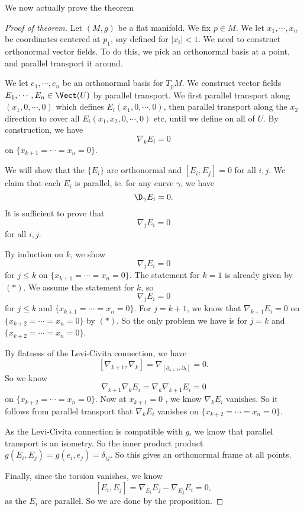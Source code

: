 \documentclass[a4paper]{article}
\begin{document}
We now actually prove the theorem
\begin{proof}[Proof of theorem]
  Let $(M, g)$ be a flat manifold. We fix $p \in M$. We let $x_1, \cdots, x_n$ be coordinates centered at $p_1$, say defined for $|x_i| < 1$. We need to construct orthonormal vector fields. To do this, we pick an orthonormal basis at a point, and parallel transport it around.

  We let $e_1, \cdots, e_n$ be an orthonormal basis for $T_p M$. We construct vector fields $E_1, \cdots, E_n \in \Vect(U)$ by parallel transport. We first parallel transport along $(x_1, 0, \cdots, 0)$ which defines $E_i(x_1, 0, \cdots, 0)$, then parallel transport along the $x_2$ direction to cover all $E_i(x_1, x_2, 0, \cdots, 0)$ etc, until we define on all of $U$. By construction, we have
  \[
    \nabla_k E_i = 0\tag{$*$}
  \]
  on $\{x_{k + 1} = \cdots = x_n = 0\}$.

  We will show that the $\{E_i\}$ are orthonormal and $[E_i, E_j] = 0$ for all $i, j$. We claim that each $E_i$ is parallel, ie. for any curve $\gamma$, we have
  \[
    \D_\gamma E_i = 0.
  \]
  It is sufficient to prove that
  \[
    \nabla_{j} E_i = 0
  \]
  for all $i, j$.

  By induction on $k$, we show
  \[
    \nabla_{j} E_i = 0
  \]
  for $j \leq k$ on $\{x_{k + 1} = \cdots = x_n = 0\}$. The statement for $k = 1$ is already given by $(*)$. We assume the statement for $k$, so
  \[
    \nabla_j E_i = 0\tag{$A$}
  \]
  for $j \leq k$ and $\{x_{k + 1} = \cdots = x_n = 0\}$. For $j = k + 1$, we know that $\nabla_{k + 1} E_i = 0$ on $\{x_{k + 2} = \cdots = x_n = 0\}$ by $(*)$. So the only problem we have is for $j = k$ and $\{x_{k + 2} = \cdots = x_n = 0\}$.

  By flatness of the Levi-Civita connection, we have
  \[
    \left[\nabla_{k + 1}, \nabla_k\right] = \nabla_{[\partial_{k + 1}, \partial_k]} = 0.
  \]
  So we know
  \[
    \nabla_{k + 1} \nabla_k E_i = \nabla_k \nabla_{k + 1} E_i = 0\tag{$B$}
  \]
  on $\{x_{k + 2} = \cdots = x_n = 0\}$. Now at $x_{k + 1} = 0$ , we know $\nabla_k E_i$ vanishes. So it follows from parallel transport that $\nabla_k E_i$ vanishes on $\{x_{k + 2} = \cdots = x_n = 0\}$.

  As the Levi-Civita connection is compatible with $g$, we know that parallel transport is an isometry. So the inner product product $g(E_i, E_j) = g(e_i, e_j) = \delta_{ij}$. So this gives an orthonormal frame at all points.

  Finally, since the torsion vanishes, we know
  \[
    [E_i, E_j] = \nabla_{E_i} E_j - \nabla_{E_j} E_i = 0,
  \]
  as the $E_i$ are parallel. So we are done by the proposition.
\end{proof}
\end{document}
